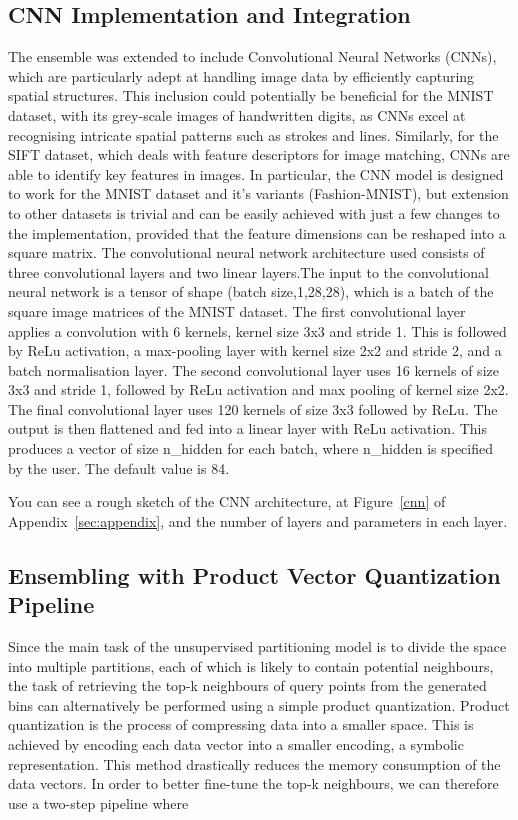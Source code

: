 \documentclass[sigconf, nonacm]{acmart}
\begin{document}
\subsection{CNN Implementation and Integration}

The ensemble was extended to include Convolutional Neural Networks (CNNs), which are particularly adept at handling image data by efficiently capturing spatial structures\cite{cnn}. This inclusion could potentially be beneficial for the MNIST dataset, with its grey-scale images of handwritten digits, as CNNs excel at recognising intricate spatial patterns such as strokes and lines. Similarly, for the SIFT dataset, which deals with feature descriptors for image matching, CNNs are able to identify key features in images. In particular, the CNN model is designed to work for the MNIST dataset and it's variants (Fashion-MNIST), but extension to other datasets is trivial and can be easily achieved with just a few changes to the implementation, provided that the feature dimensions can be reshaped into a square matrix. The convolutional neural network architecture used consists of three convolutional layers and two linear layers.The input to the convolutional neural network is a tensor of shape (batch size,1,28,28), which is a batch of the square image matrices of the MNIST dataset. The first convolutional layer applies a convolution with 6 kernels, kernel size 3x3 and stride 1. This is followed by ReLu activation, a max-pooling layer with kernel size 2x2 and stride 2, and a batch normalisation layer. The second convolutional layer uses 16 kernels of size 3x3 and stride 1, followed by ReLu activation and max pooling of kernel size 2x2. The final convolutional layer uses 120 kernels of size 3x3 followed by ReLu. The output is then flattened and fed into a linear layer with ReLu activation. This produces a vector of size n\_hidden for each batch, where n\_hidden is specified by the user. The default value is 84.

You can see a rough sketch of the CNN architecture, at Figure~\ref{cnn} of Appendix~\ref{sec:appendix}, and the number of layers and parameters in each layer.

\subsection{Ensembling with Product Vector Quantization Pipeline}

Since the main task of the unsupervised partitioning model is to divide the space into multiple partitions, each of which is likely to contain potential neighbours, the task of retrieving the top-k neighbours of query points from the generated bins can alternatively be performed using a simple product quantization. Product quantization \cite{pquantize} is the process of compressing data into a smaller space. This is achieved by encoding each data vector into a smaller encoding, a symbolic representation. This method drastically reduces the memory consumption of the data vectors.
In order to better fine-tune the top-k neighbours, we can therefore use a two-step pipeline where
\end{document}
